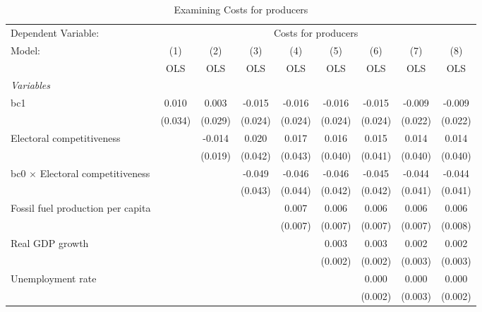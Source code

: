 
\begin{table}[htbp]
   \caption{Examining Costs for producers}
   \centering
   \begin{tabular}{lcccccccc}
      \toprule
      Dependent Variable: & \multicolumn{8}{c}{Costs for producers}\\
      Model:                                  & (1)     & (2)     & (3)     & (4)     & (5)     & (6)     & (7)     & (8)\\  
                                              &  OLS    & OLS     & OLS     & OLS     & OLS     & OLS     & OLS     & OLS\\  
      \midrule
      \emph{Variables}\\
      bc1                                     & 0.010   & 0.003   & -0.015  & -0.016  & -0.016  & -0.015  & -0.009  & -0.009\\   
                                              & (0.034) & (0.029) & (0.024) & (0.024) & (0.024) & (0.024) & (0.022) & (0.022)\\   
      Electoral competitiveness               &         & -0.014  & 0.020   & 0.017   & 0.016   & 0.015   & 0.014   & 0.014\\   
                                              &         & (0.019) & (0.042) & (0.043) & (0.040) & (0.041) & (0.040) & (0.040)\\   
      bc0 $\times$ Electoral competitiveness  &         &         & -0.049  & -0.046  & -0.046  & -0.045  & -0.044  & -0.044\\   
                                              &         &         & (0.043) & (0.044) & (0.042) & (0.042) & (0.041) & (0.041)\\   
      Fossil fuel production per capita       &         &         &         & 0.007   & 0.006   & 0.006   & 0.006   & 0.006\\   
                                              &         &         &         & (0.007) & (0.007) & (0.007) & (0.007) & (0.008)\\   
      Real GDP growth                         &         &         &         &         & 0.003   & 0.003   & 0.002   & 0.002\\   
                                              &         &         &         &         & (0.002) & (0.002) & (0.003) & (0.003)\\   
      Unemployment rate                       &         &         &         &         &         & 0.000   & 0.000   & 0.000\\   
                                              &         &         &         &         &         & (0.002) & (0.003) & (0.002)\\   

\end{tabular}
\end{table}
